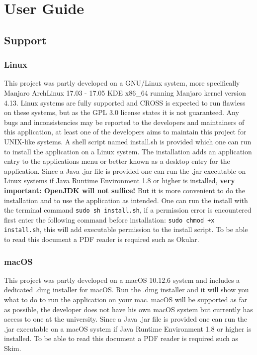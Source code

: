 \documentclass[11pt]{article}
\newcommand{\code}[1]{\texttt{#1}}
\begin{document}
	\section{User Guide}
		\subsection{Support}
			\subsubsection{Linux}
				This project was partly developed on a GNU/Linux system, more specifically Manjaro ArchLinux 17.03 - 17.05 KDE x86\_64 running Manjaro kernel version 4.13. Linux systems are fully supported and CROSS is expected to run flawless on these systems, but as the GPL 3.0 license states it is not guaranteed. Any bugs and inconsistencies may be reported to the developers and maintainers of this application, at least one of the developers aims to maintain this project for UNIX-like systems. A shell script named install.sh is provided which one can run to install the application on a Linux system. The installation adds an application entry to the applications menu or better known as a desktop entry for the application. Since a Java .jar file is provided one can run the .jar executable on Linux systems if Java Runtime Environment 1.8 or higher is installed, \textbf{very important: OpenJDK will not suffice!} But it is more convenient to do the installation and to use the application as intended. One can run the install with the terminal command \code{sudo sh install.sh}, if a permission error is encountered first enter the following command before installation: \code{sudo chmod +x install.sh}, this will add executable permission to the install script. To be able to read this document a PDF reader is required such as Okular.

			\subsubsection{macOS}
				This project was partly developed on a macOS 10.12.6 system and includes a dedicated .dmg installer for macOS. Run the .dmg installer and it will show you what to do to run the application on your mac. macOS will be supported as far as possible, the developer does not have his own macOS system but currently has access to one at the university. Since a Java .jar file is provided one can run the .jar executable on a macOS system if Java Runtime Environment 1.8 or higher is installed. To be able to read this document a PDF reader is required such as Skim.
\end{document}
